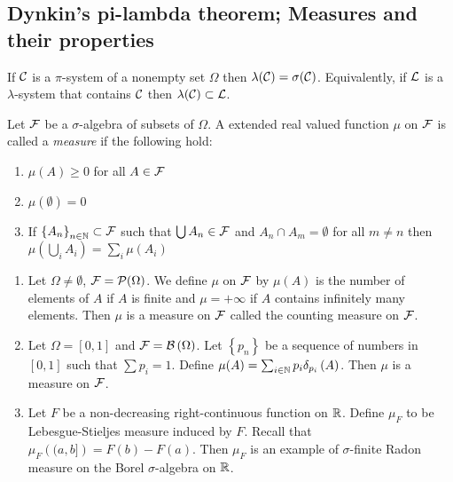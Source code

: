 \subsection{Dynkin's pi-lambda theorem; Measures and their properties}

\begin{theorem}
    If ${\cal C}$ is a $\pi$-system of a nonempty set $\Omega$ then $\lambda ({\cal C}) = \sigma ({\cal C})$. Equivalently, if ${\cal L}$ is a $\lambda$-system that contains ${\cal C}$ then $\lambda ({\cal C}) \subset {\cal L}$.
    \label{thm:dynkin}
\end{theorem}

\begin{definition}
    Let ${\cal F}$ be a $\sigma$-algebra of subsets of $\Omega$. A extended real valued function $\mu$ on ${\cal F}$ is called a \textit{measure} if the following hold:
    \begin{enumerate}
	\item $\mu \left(A\right) \ge 0$ for all $A\in {\cal F}$
	\item $\mu \left( \emptyset \right) = 0$
	\item If $\left\{ A_n \right\}_{n \in \mathbb N} \subset {\cal F}$ such that $\bigcup A_n \in {\cal F}$ and $A_n \cap A_m =\emptyset$ for all $m\ne n$ then $\mu \left( \bigcup_{i} A_i \right) =\sum_{i} \mu (A_i)$
    \end{enumerate}
    \label{def:measure}
\end{definition}

\begin{example}
    \begin{enumerate}

	\item Let $\Omega \ne \emptyset$, ${\cal F} = {\cal P} (\Omega)$. We define $\mu$ on ${\cal F}$ by $\mu (A)$ is the number of elements of $A$ if $A$ is finite and $\mu = +\infty$ if $A$ contains infinitely many elements. Then $\mu$ is a measure on ${\cal F}$ called the counting measure on ${\cal F}$.

	\item Let $\Omega =[0,1]$ and ${\cal F} = {\cal B} \left( \Omega \right)$. Let $\left\{ p_n \right\}$ be a sequence of numbers in $[0,1]$ such that $\sum p_i =1$. Define $\mu (A) = \sum_{i\in\mathbb N} p_i \delta _{p_i} \left( A \right)$. Then $\mu $ is a measure on ${\cal F}$.

	\item Let $F$ be a non-decreasing right-continuous function on $\mathbb R$. Define $\mu_F$ to be Lebesgue-Stieljes measure induced by $F$. Recall that $\mu_F \left( (a,b] \right) = F(b)-F(a)$. Then $\mu _F$ is an example of $\sigma$-finite Radon measure on the Borel $\sigma$-algebra on $\mathbb R$.

    \end{enumerate}
\end{example}

